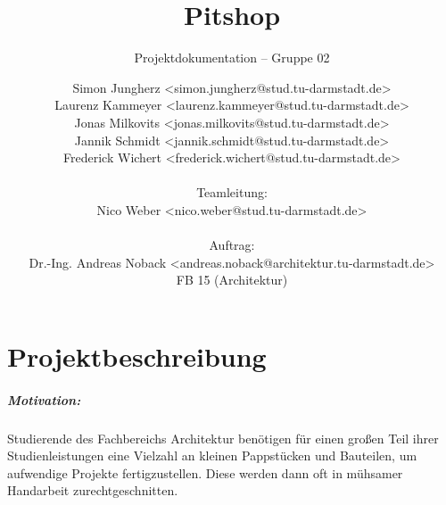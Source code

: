 \documentclass[
ngerman,
accentcolor=2d,
marginpar=false,
class=report,
fontsize=11pt,
ruledheaders=section,
]{tudapub}
\begin{document}
	\title{Pitshop}
	\subtitle{Projektdokumentation -- Gruppe 02\\}

	\author{
		Simon Jungherz <simon.jungherz@stud.tu-darmstadt.de>\\
		Laurenz Kammeyer <laurenz.kammeyer@stud.tu-darmstadt.de>\\
		Jonas Milkovits <jonas.milkovits@stud.tu-darmstadt.de>\\
		Jannik Schmidt <jannik.schmidt@stud.tu-darmstadt.de>\\
		Frederick Wichert <frederick.wichert@stud.tu-darmstadt.de>\\\\
		Teamleitung:\\
		Nico Weber <nico.weber@stud.tu-darmstadt.de>\\\\
		Auftrag:\\
		Dr.-Ing. Andreas Noback <andreas.noback@architektur.tu-darmstadt.de>\\
		FB 15 (Architektur)\\
	}

	\maketitle
	\tableofcontents

	\chapter{Projektbeschreibung}

	    \paragraph{Motivation:}
	    Studierende des Fachbereichs Architektur benötigen für einen großen Teil ihrer Studienleistungen eine Vielzahl an kleinen Pappstücken und Bauteilen, um aufwendige Projekte fertigzustellen. Diese werden dann oft in mühsamer Handarbeit zurechtgeschnitten.
\end{document}
